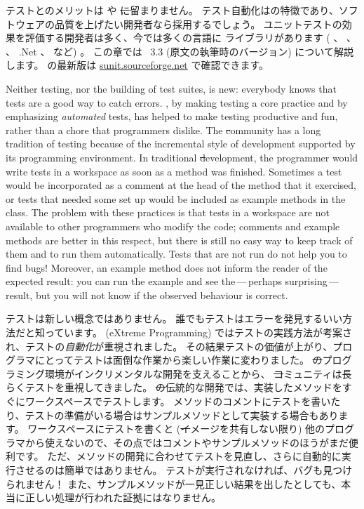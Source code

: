 \documentclass[a4paper,10pt,twoside]{book}
\begin{document}
テストとのメリットは \pharo や \st に留まりません。
テスト自動化はの特徴であり、ソフトウェアの品質を上げたい開発者なら採用するでしょう。 
ユニットテストの効果を評価する開発者は多く、今では多くの言語に \xUnit{} ライブラリがあります ( 、  、  、 .Net 、 など) 。
この章では \SUnit~3.3 (原文の執筆時のバージョン) について解説します。
\sunit の最新版は \url{sunit.sourceforge.net} で確認できます。

Neither testing, nor the building of test suites, is new:  everybody knows that
tests are a good way to catch errors.
\mbox{,} by making testing a
core practice and by emphasizing \emph{automated} tests, 
has helped to make testing productive and fun, rather than a 
chore that programmers dislike.
The \st community has a long tradition of
testing because of the incremental style of development supported by its
programming environment.  
In traditional \st development, the programmer would write tests in a workspace
as soon as a method was finished.
Sometimes a test would be incorporated as a comment at the head of the method that it exercised, or tests that needed some set up would be included as example methods in the class.
The problem with these practices is that tests in a workspace are not available to other programmers who modify the code; comments and example methods are better in this respect, 
but there is still no easy way to keep track of them and
to run them automatically.
Tests that are not run do not help you to find bugs!
Moreover, an example method does not
inform the reader of the expected result:
you can run the example and see the\,---\,perhaps surprising\,---\,result, 
but you will not know if the observed behaviour is correct.
\fi

テストは新しい概念ではありません。
誰でもテストはエラーを発見するいい方法だと知っています。
\mbox{} (eXtreme Programming) ではテストの実践方法が考案され、テストの\emph{自動化}が重視されました。
その結果テストの価値が上がり、プログラマにとってテストは面倒な作業から楽しい作業に変わりました。
\st のプログラミング環境がインクリメンタルな開発を支えることから、 \st コミュニティは長らくテストを重視してきました。
\st の伝統的な開発では、実装したメソッドをすぐにワークスペースでテストします。
メソッドのコメントにテストを書いたり、テストの準備がいる場合はサンプルメソッドとして実装する場合もあります。
ワークスペースにテストを書くと (\st イメージを共有しない限り) 他のプログラマから使えないので、その点ではコメントやサンプルメソッドのほうがまだ便利です。
ただ、メソッドの開発に合わせてテストを見直し、さらに自動的に実行させるのは簡単ではありません。
テストが実行されなければ、バグも見つけられません！
また、サンプルメソッドが一見正しい結果を出したとしても、本当に正しい処理が行われた証拠にはなりません。
\end{document}
